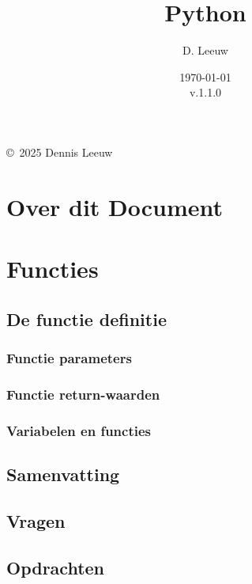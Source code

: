 \documentclass[a4paper,12pt,twoside,openright,titlepage]{book}
\author{D. Leeuw}
\title{Python}
\date{\today\\v.1.1.0}
\begin{document}

\maketitle

\copyright\ 2025 Dennis Leeuw\\




\frontmatter
\chapter{Over dit Document}
%
%

\tableofcontents

\mainmatter

\chapter{Functies}

\section{De functie definitie}

\subsection{Functie parameters}

\subsection{Functie return-waarden}

\subsection{Variabelen en functies}

\section{Samenvatting}

\section{Vragen}

\section{Opdrachten}


\printindex
\end{document}
